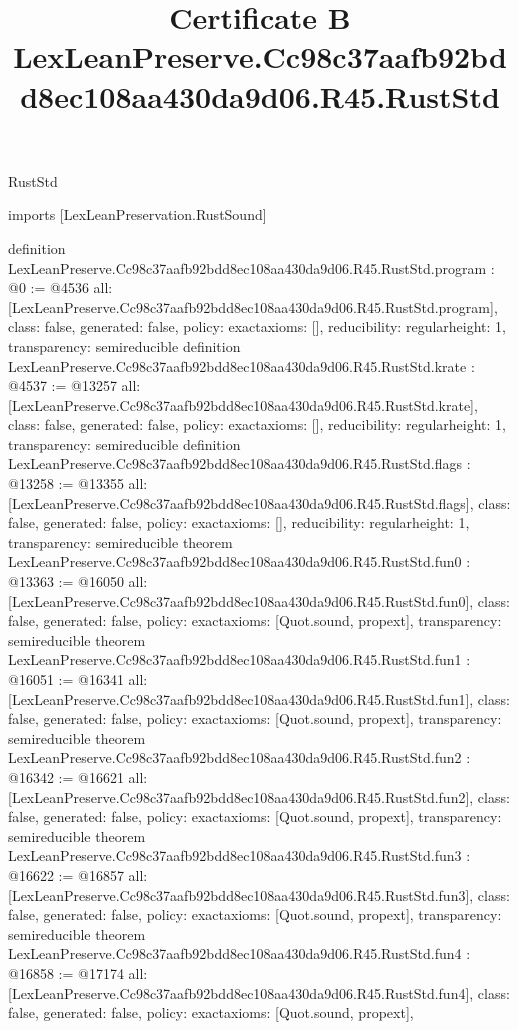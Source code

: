 \begin{lexlean}{RustStd}
\title{Certificate B LexLeanPreserve.Cc98c37aafb92bdd8ec108aa430da9d06.R45.RustStd}
\begin{coremodule}
imports [LexLeanPreservation.RustSound]

definition LexLeanPreserve.Cc98c37aafb92bdd8ec108aa430da9d06.R45.RustStd.program : @0 := @4536 {
  all: [LexLeanPreserve.Cc98c37aafb92bdd8ec108aa430da9d06.R45.RustStd.program],
  class: false,
  generated: false,
  policy: exact{axioms: []},
  reducibility: regular{height: 1},
  transparency: semireducible
}
definition LexLeanPreserve.Cc98c37aafb92bdd8ec108aa430da9d06.R45.RustStd.krate : @4537 := @13257 {
  all: [LexLeanPreserve.Cc98c37aafb92bdd8ec108aa430da9d06.R45.RustStd.krate],
  class: false,
  generated: false,
  policy: exact{axioms: []},
  reducibility: regular{height: 1},
  transparency: semireducible
}
definition LexLeanPreserve.Cc98c37aafb92bdd8ec108aa430da9d06.R45.RustStd.flags : @13258 := @13355 {
  all: [LexLeanPreserve.Cc98c37aafb92bdd8ec108aa430da9d06.R45.RustStd.flags],
  class: false,
  generated: false,
  policy: exact{axioms: []},
  reducibility: regular{height: 1},
  transparency: semireducible
}
theorem LexLeanPreserve.Cc98c37aafb92bdd8ec108aa430da9d06.R45.RustStd.fun0 : @13363 := @16050 {
  all: [LexLeanPreserve.Cc98c37aafb92bdd8ec108aa430da9d06.R45.RustStd.fun0],
  class: false,
  generated: false,
  policy: exact{axioms: [Quot.sound, propext]},
  transparency: semireducible
}
theorem LexLeanPreserve.Cc98c37aafb92bdd8ec108aa430da9d06.R45.RustStd.fun1 : @16051 := @16341 {
  all: [LexLeanPreserve.Cc98c37aafb92bdd8ec108aa430da9d06.R45.RustStd.fun1],
  class: false,
  generated: false,
  policy: exact{axioms: [Quot.sound, propext]},
  transparency: semireducible
}
theorem LexLeanPreserve.Cc98c37aafb92bdd8ec108aa430da9d06.R45.RustStd.fun2 : @16342 := @16621 {
  all: [LexLeanPreserve.Cc98c37aafb92bdd8ec108aa430da9d06.R45.RustStd.fun2],
  class: false,
  generated: false,
  policy: exact{axioms: [Quot.sound, propext]},
  transparency: semireducible
}
theorem LexLeanPreserve.Cc98c37aafb92bdd8ec108aa430da9d06.R45.RustStd.fun3 : @16622 := @16857 {
  all: [LexLeanPreserve.Cc98c37aafb92bdd8ec108aa430da9d06.R45.RustStd.fun3],
  class: false,
  generated: false,
  policy: exact{axioms: [Quot.sound, propext]},
  transparency: semireducible
}
theorem LexLeanPreserve.Cc98c37aafb92bdd8ec108aa430da9d06.R45.RustStd.fun4 : @16858 := @17174 {
  all: [LexLeanPreserve.Cc98c37aafb92bdd8ec108aa430da9d06.R45.RustStd.fun4],
  class: false,
  generated: false,
  policy: exact{axioms: [Quot.sound, propext]},
}
\end{coremodule}
\end{lexlean}
